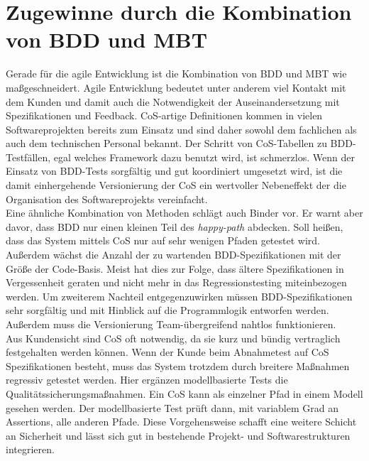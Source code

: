\section{Zugewinne durch die Kombination von BDD und MBT}
Gerade für die agile Entwicklung ist die Kombination von BDD und MBT wie maßgeschneidert. Agile Entwicklung bedeutet unter anderem viel Kontakt mit dem Kunden und damit auch die Notwendigkeit der Auseinandersetzung mit Spezifikationen und Feedback. CoS-artige Definitionen kommen in vielen Softwareprojekten bereits zum Einsatz und sind daher sowohl dem fachlichen als auch dem technischen Personal bekannt. Der Schritt von CoS-Tabellen zu BDD-Testfällen, egal welches Framework dazu benutzt wird, ist schmerzlos. Wenn der Einsatz von BDD-Tests sorgfältig und gut koordiniert umgesetzt wird, ist die damit einhergehende Versionierung der CoS ein wertvoller Nebeneffekt der die Organisation des Softwareprojekts vereinfacht.\\
Eine ähnliche Kombination von Methoden schlägt auch Binder vor\cite{binder_model-based_2014}. Er warnt aber davor, dass BDD nur einen kleinen Teil des \textit{happy-path} abdecken. Soll heißen, dass das System mittels CoS nur auf sehr wenigen Pfaden getestet wird. Außerdem wächst die Anzahl der zu wartenden BDD-Spezifikationen mit der Größe der Code-Basis. Meist hat dies zur Folge, dass ältere Spezifikationen in Vergessenheit geraten und nicht mehr in das Regressionstesting miteinbezogen werden. Um zweiterem Nachteil entgegenzuwirken müssen BDD-Spezifikationen sehr sorgfältig und mit Hinblick auf die Programmlogik entworfen werden. Außerdem muss die Versionierung Team-übergreifend nahtlos funktionieren.\\
Aus Kundensicht sind CoS oft notwendig, da sie kurz und bündig vertraglich festgehalten werden können. Wenn der Kunde beim Abnahmetest auf CoS Spezifikationen besteht, muss das System trotzdem durch breitere Maßnahmen regressiv getestet werden. Hier ergänzen modellbasierte Tests die Qualitätssicherungsmaßnahmen. Ein CoS kann als einzelner Pfad in einem Modell gesehen werden. Der modellbasierte Test prüft dann, mit variablem Grad an Assertions, alle anderen Pfade. Diese Vorgehensweise schafft eine weitere Schicht an Sicherheit und lässt sich gut in bestehende Projekt- und Softwarestrukturen integrieren.













